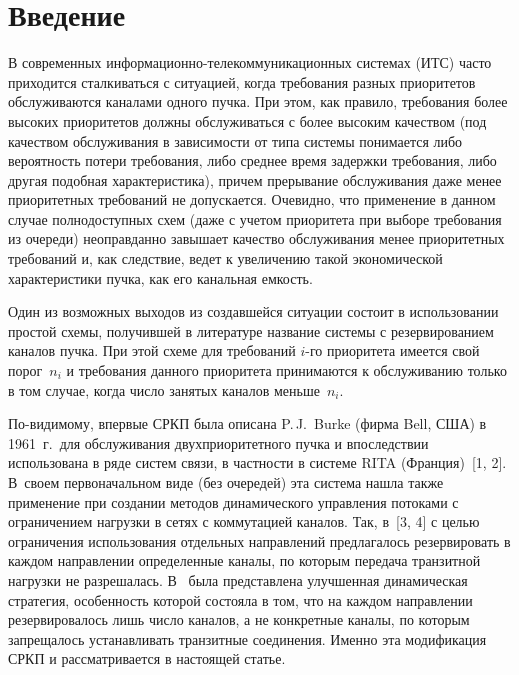       \begin{multicols}{2}
      
            \label{st\stat}

\section{Введение}

В современных информационно-те\-ле\-ком\-му\-ни\-ка\-ци\-он\-ных сис\-те\-мах (ИТС)
часто приходится сталкиваться с ситуацией,
когда требования разных приоритетов обслуживаются каналами
одного пучка.
При этом, как правило, требования более высоких приоритетов
должны обслуживаться с более высоким качеством (под качеством
обслуживания в зави\-си\-мости от типа системы понимается либо
вероятность потери требования, либо среднее время задержки
требования, либо другая подобная характеристика), причем
прерывание обслуживания даже менее приоритетных требований не
допускается.
Очевидно, что применение в данном случае полнодоступных схем
(даже с учетом приоритета при выборе требования из очереди)
неоправданно завышает качество обслуживания менее приоритетных
требований и, как следствие, ведет к увеличению такой
экономической характеристики пучка, как его канальная емкость.

Один из возможных выходов из создавшейся ситуации состоит в
использовании простой схемы, получившей в литературе
название системы с резервированием каналов пучка.
При этой схеме для требований $i$-го приоритета имеется
свой порог~$n_i$ и требования данного приоритета принимаются к
обслуживанию только в том случае, когда число занятых
каналов меньше~$n_i$.

По-видимому, впервые СРКП была описана P.\,J.~Burke (фирма Bell,
США) в 1961~г.\ для обслуживания двухприоритетного пучка и
впоследствии использована в ряде систем связи, в частности в системе
RITA (Франция)~[1, 2]. В~своем первоначальном виде (без очередей)
эта система нашла также применение при создании методов
динамического управления потоками с ограничением нагрузки в сетях с
коммутацией каналов. Так, в~[3, 4] с целью ограничения использования
отдельных направлений предлагалось резервировать в каждом
направлении определенные каналы, по которым передача транзитной
нагрузки не разрешалась. В~\cite{8-p} была представлена улучшенная
динамическая стратегия, особенность которой состояла в том, что на
каждом направлении резервировалось лишь число каналов, а не
конкретные каналы, по которым запрещалось устанавливать транзитные
соединения. Именно эта модификация СРКП и рассматривается в
настоящей статье.


\end{multicols}
